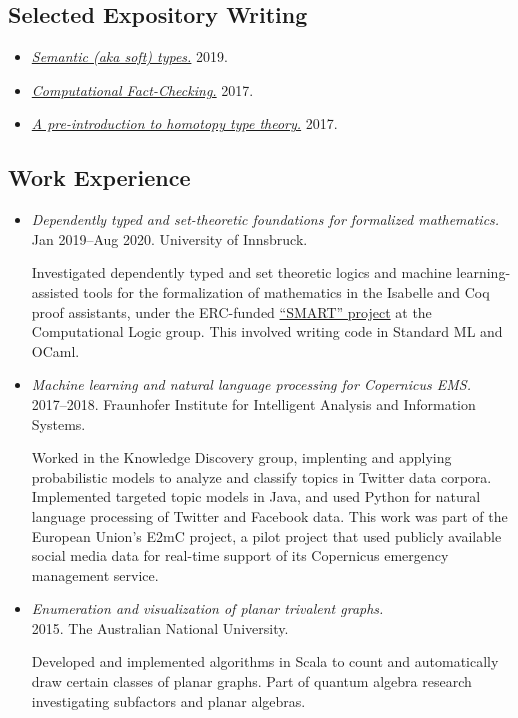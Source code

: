 \documentclass[12pt,a4paper]{article}
\providecommand{\tightlist}{%
  \setlength{\itemsep}{0pt}\setlength{\parskip}{0pt}}
\begin{document}
\newpage

\subsection{Selected Expository Writing}

\begin{itemize}
\tightlist
\item \href{https://joshchen.io/pdf/soft-types-abstract.pdf}{\emph{Semantic (aka soft) types.}} 2019.
\item \href{https://joshchen.io/pdf/computational-fact-checking-report.pdf}{\emph{Computational Fact-Checking.}} 2017.
\item \href{https://joshchen.io/pdf/hott-preintro-notes.pdf}{\emph{A pre-introduction to homotopy type theory.}} 2017.
\end{itemize}

\subsection{Work Experience}\label{previous-work-research}

\begin{itemize}
\item
  \emph{Dependently typed and set-theoretic foundations for formalized mathematics.}\\
  Jan 2019--Aug 2020.
  University of Innsbruck.

  Investigated dependently typed and set theoretic logics and machine learning-assisted tools for the formalization of mathematics in the Isabelle and Coq proof assistants, under the ERC-funded \href{https://project-smart.uibk.ac.at}{``SMART'' project} at the Computational Logic group.
  This involved writing code in Standard ML and OCaml.

\item
  \emph{Machine learning and natural language processing for Copernicus EMS.}\\
  2017--2018.
  Fraunhofer Institute for Intelligent Analysis and Information Systems.

  Worked in the Knowledge Discovery group, implenting and applying probabilistic models to analyze and classify topics in Twitter data corpora.
  Implemented targeted topic models in Java, and used Python for natural language processing of Twitter and Facebook data.
  This work was part of the European Union's E2mC project, a pilot project that used publicly available social media data for real-time support of its Copernicus emergency management service.

\item
  \emph{Enumeration and visualization of planar trivalent graphs.}\\
  2015.
  The Australian National University.

  Developed and implemented algorithms in Scala to count and automatically draw certain classes of planar graphs.
  Part of quantum algebra research investigating subfactors and planar algebras.
\end{itemize}
\end{document}
